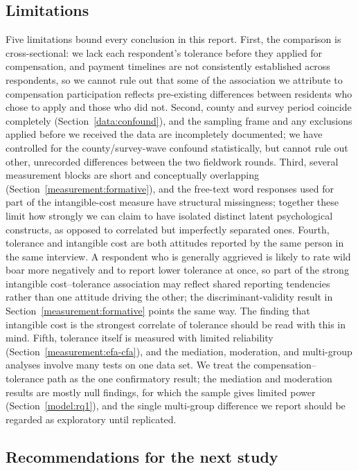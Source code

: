 \subsection{Limitations}
\label{discussion:limitations}

Five limitations bound every conclusion in this report. First, the
comparison is cross-sectional: we lack each respondent's tolerance before
they applied for compensation, and payment timelines are not consistently
established across respondents, so we cannot rule out that some of the
association we attribute to compensation participation reflects
pre-existing differences between residents who chose to apply and those who
did not. Second, county and survey period coincide completely
(Section~\ref{data:confound}), and the sampling frame and any exclusions
applied before we received the data are incompletely documented; we have
controlled for the county/survey-wave confound statistically, but cannot
rule out other, unrecorded differences between the two fieldwork rounds.
Third, several measurement blocks are short and conceptually overlapping
(Section~\ref{measurement:formative}), and the free-text word responses
used for part of the intangible-cost measure have structural missingness;
together these limit how strongly we can claim to have isolated distinct
latent psychological constructs, as opposed to correlated but imperfectly
separated ones. Fourth, tolerance and intangible cost are both attitudes
reported by the same person in the same interview. A respondent who is
generally aggrieved is likely to rate wild boar more negatively and to
report lower tolerance at once, so part of the strong intangible
cost--tolerance association may reflect shared reporting tendencies rather
than one attitude driving the other; the discriminant-validity result in
Section~\ref{measurement:formative} points the same way. The finding that
intangible cost is the strongest correlate of tolerance should be read with
this in mind. Fifth, tolerance itself is measured with limited reliability
(Section~\ref{measurement:efa-cfa}), and the mediation, moderation, and
multi-group analyses involve many tests on one data set. We treat the
compensation--tolerance path as the one confirmatory result; the mediation
and moderation results are mostly null findings, for which the sample gives
limited power (Section~\ref{model:rq1}), and the single multi-group
difference we report should be regarded as exploratory until replicated.

\subsection{Recommendations for the next study}
\label{discussion:next-steps}

